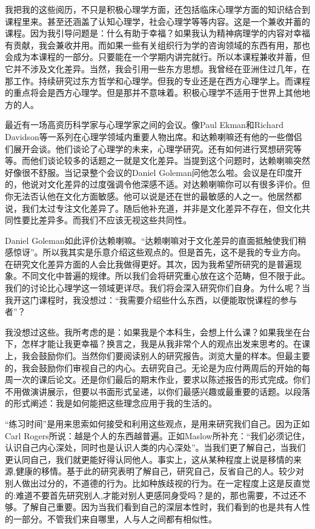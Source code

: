 我把我的这些阅历，不只是积极心理学方面，还包括临床心理学方面的知识结合到课程里来。甚至还涵盖了认知心理学，社会心理学等等内容。这是一个兼收并蓄的课程。因为我引导问题是：什么有助于幸福？如果我认为精神病理学的内容对幸福有贡献，我会兼收并用。而如果一些有关组织行为学的咨询领域的东西有用，那也会成为本课程的一部分。只要能在一个学期内讲完就行。所以本课程兼收并蓄，但它并不涉及文化差异。当然，我会引用一些东方思想。我曾经在亚洲住过几年，在那工作。持续研究过东方哲学和心理学。但我的专业还是在西方心理学上。而课程的重点将会是西方心理学。但是那并不意味着。积极心理学不适用于世界上其他地方的人。

最近有一场高资历科学家与心理学家之间的会议。像Paul Ekman和Richard Davidson等一系列在心理学领域内重要人物出席。和达赖喇嘛还有他的一些僧侣们展开会谈。他们谈论了心理学的未来，心理学研究。还有如何进行冥想研究等等。而他们谈论较多的话题之一就是文化差异。当提到这个问题时，达赖喇嘛突然好像很不舒服。当记录整个会议的Daniel Goleman问他怎么啦。会议是在印度开的，他说对文化差异的过度强调令他深感不适。对达赖喇嘛你可以有很多评价。但你无法否认他在文化方面敏感。他可以说是还在世的最敏感的人之一。他居然都说，我们太过专注文化差异了。随后他补充道，并非是文化差异不存在，但文化共同性要比差异多。而我们不应该无视这些共同性。

Daniel Goleman如此评价达赖喇嘛。“达赖喇嘛对于文化差异的直面抵触使我们稍感惊讶”。所以我其实是乐意介绍这些观点的。但是首先，这不是我的专业方向。在研究文化差异方面的人会比我做得更好。其次，因为我希望所研究的是普遍现象。不同文化中普遍的规律。所以我们会将研究重心放在这个范畴，但不限于此。我们的讨论比心理学这一领域更详尽。我们将会深入研究你们自身。为什么呢？当我开这门课程时，我没想过：“我需要介绍些什么东西，以便能取悦课程的参与者”？ 

我没想过这些。我所考虑的是：如果我是个本科生，会想上什么课？如果我坐在台下，怎样才能让我更幸福？换言之，我是从我非常个人的观点出发来思考的。在课上，我会鼓励你们。当然你们要阅读别人的研究报告。浏览大量的样本。但最主要的，我会鼓励你们审视自己的内心。去研究自己。无论是为应付两周后的开始的每周一次的课后论文。还是你们最后的期末作业，要求以陈述报告的形式完成。你们不用做演讲展示，但要以书面形式呈递，以你们最感兴趣或最重要的话题。以段落的形式阐述：我是如何能把这些理念应用于我的生活的。

“练习时间”是用来思索如何接受和利用这些观点，是用来研究我们自己。因为正如Carl Rogers所说：越是个人的东西越普遍。正如Maslow所补充：“我们必须记住，认识自己内心深处，同时也是认识人类的内心深处”。当我们更了解自己，当我们更认同自己，我们就更能好得认同他人。事实上，这从某种程度上说是移情的来源,健康的移情。基于此的研究表明了解自己，研究自己，反省自己的人。较少对别人做出过分的，不道德的行为。比如种族歧视的行为。在一定程度上这是反直觉的:难道不要首先研究别人,才能对别人更感同身受吗？是的，那也需要，不过还不够。了解自己重要。因为当我们看到自己的深层本性时，我们看到的也是共有人性的一部分。不管我们来自哪里，人与人之间都有相似性。 


